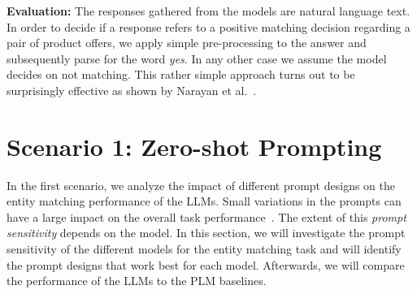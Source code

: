 \documentclass[sigconf,nonacm]{acmart}
\begin{document}
\textbf{Evaluation:} The responses gathered from the models are natural language text. In order to decide if a response refers to a positive matching decision regarding a pair of product offers, we apply simple pre-processing to the answer and subsequently parse for the word \textit{yes}. In any other case we assume the model decides on not matching. This rather simple approach turns out to be surprisingly effective as shown by Narayan et al.~\cite{foundationalWrangleVLDB2022}.  \section{Scenario 1: Zero-shot Prompting}
\label{sec:zeroshot}

In the first scenario, we analyze the impact of different prompt designs on the entity matching performance of the LLMs. Small variations in the prompts can have a large impact on the overall task performance~\cite{foundationalWrangleVLDB2022,zhao2021calibrate,promptingSurvey2023}. The extent of this \textit{prompt sensitivity} depends on the model. In this section, we will investigate the prompt sensitivity of the different models for the entity matching task and will identify the prompt designs that work best for each model. Afterwards, we will compare the performance of the LLMs to the PLM baselines.
\end{document}
